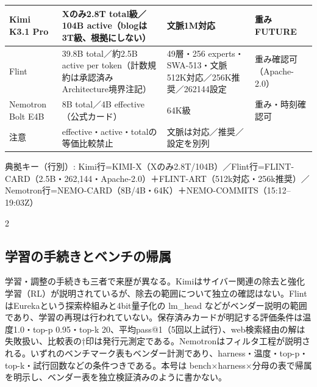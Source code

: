 \documentclass[lualatex,a4paper,10pt]{jlreq}
\begin{document}
{\centering\footnotesize
{}
\begin{tabularx}{0.96\linewidth}{@{}lXXX@{}}
\toprule
Kimi K3.1 Pro & Xのみ2.8T total級／104B active（blogは3T級、根拠にしない） & 文脈1M対応 & 重みFUTURE \\
\midrule
Flint & 39.8B total／約2.5B active per token（計数規約は承認済みArchitecture境界注記） & 49層・256 experts・SWA-513・文脈512K対応／256K推奨／262144設定 & 重み確認可（Apache-2.0） \\
Nemotron Bolt E4B & 8B total／4B effective（公式カード） & 64K級 & 重み・時刻確認可 \\
注意 & effective・active・totalの等価比較禁止 & 文脈は対応／推奨／設定を別列 &  \\
\bottomrule
\end{tabularx}
{\scriptsize\color{SurveyMuted} 典拠キー（行別）: Kimi行=KIMI-X（Xのみ2.8T/104B）／Flint行=FLINT-CARD（2.5B・262,144・Apache-2.0）＋FLINT-ART（512k対応・256k推奨）／Nemotron行=NEMO-CARD（8B/4B・64K）＋NEMO-COMMITS（15:12–19:03Z）\par}
} %
\begin{multicols}{2} %


\subsection*{学習の手続きとベンチの帰属}


学習・調整の手続きも三者で来歴が異なる。Kimiはサイバー関連の除去と強化学習（RL）が説明されているが、除去の範囲について独立の確認はない。FlintはEurekaという探索枠組みと4bit量子化の lm\_head などがベンダー説明の範囲であり、学習の再現は行われていない。保存済みカードが明記する評価条件は温度1.0・top-p 0.95・top-k 20、平均pass@1（5回以上試行）、web検索経由の解は失敗扱い、比較表の†印は発行元測定である。Nemotronはフィルタ工程が説明される。いずれのベンチマーク表もベンダー計測であり、harness・温度・top-p・top-k・試行回数などの条件つきである。本号は bench×harness×分母の表で帰属を明示し、ベンダー表を独立検証済みのように書かない。


\end{multicols} %
\end{document}
